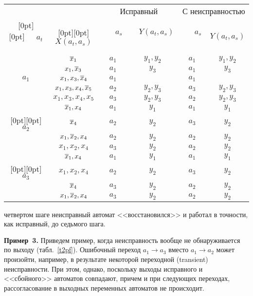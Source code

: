 \begin{multicols}{2}
\begin{enumerate}[(1)]
\begin{table*}
\begin{center}
\begin{tabular}{|c|c|c|c|c|c|}
\hline
 & &
\multicolumn{2}{|c|}{ Исправный} &
\multicolumn{2}{|c|}{С неисправностью} \\
\cline{3-6}
\multicolumn{1}{|c|}{\raisebox{6pt}[0pt][0pt]{\ \ \ $a_t$\ \ \ }} &
\multicolumn{1}{|c|}{\raisebox{6pt}[0pt][0pt]{$X(a_t,a_s)$}}
&\ \ \ $a_s$\ \ \ &\ \ $Y(a_t,a_s)$\ \ &
 \ \ \ $a_s$\ \ \ & $Y(a_t,a_s)$ \\
\hline
 & $\overline x_1$ & $a_1$ & $y_1,y_2$ & $a_1$ & $y_1,y_2$ \\
 & $x_1,\overline x_3$ & $a_1$ & $y_3$ & $a_1$ & $y_3$ \\
$a_1$ & $x_1,x_3,\overline x_4$ & $a_1$ & & $a_1$ & \\
 & $x_1,x_3,x_4,\overline x_5$ & $a_2$ & $y_2,y_3$ & $a_3$ & $y_2,y_3$ \\
 & $x_1,x_3,x_4,x_5$ & $a_3$ & $y_2,y_3$ & $a_2$ & $y_2,y_3$ \\
\hline
 & $\overline x_1,x_4$ & $a_1$ & $y_1$ & $a_1$ & $y_1$ \\
\multicolumn{1}{|c|}{\raisebox{-6pt}[0pt][0pt]{$a_2$ }}& $\overline x_4$ & $a_2$ & $y_2$ & $a_3$ & $y_2$ \\
 & $x_1,\overline x_2,x_4$ & $a_2$ & $y_2$ & $a_2$ & $y_2$ \\
 & $x_1,x_2,x_4$ & $a_3$ & $y_2$ & $a_2$ & $y_2$ \\
\hline
 & $\overline x_1,x_4$ & $a_1$ & $y_1$ & $a_1$ & $y_1$ \\
\multicolumn{1}{|c|}{\raisebox{-6pt}[0pt][0pt]{$a_3$}} & $x_1,x_2,x_4$ & $a_2$ & $y_2$ & $a_3$ & $y_2$ \\
 & $\overline x_4$ & $a_3$ & $y_2$ & $a_2$ & $y_2$ \\
 & $x_1,\overline x_2,x_4$ & $a_3$ & $y_2$ & $a_2$ & $y_2$ \\
\hline
\end{tabular}
\end{center}
\end{table*}
четвертом шаге неисправный автомат <<восстановился>>
и работал в точности, как исправный, до седьмого шага.
\end{enumerate}


\medskip

\noindent
{\bf Пример~3.} Приведем пример, когда неисправность вообще не
обнаруживается по выходу (табл.~\ref{t2pf}).
Ошибочный переход $a_1 \to a_3$ вместо $a_1 \to a_2$ может произойти,
например, в результате некоторой переходной (transient) неисправности.
При этом, однако, поскольку выходы исправного и <<сбойного>> автоматов
совпадают, причем и при следующих переходах, рассогласование в выходных
переменных автоматов не происходит.


\end{multicols}
